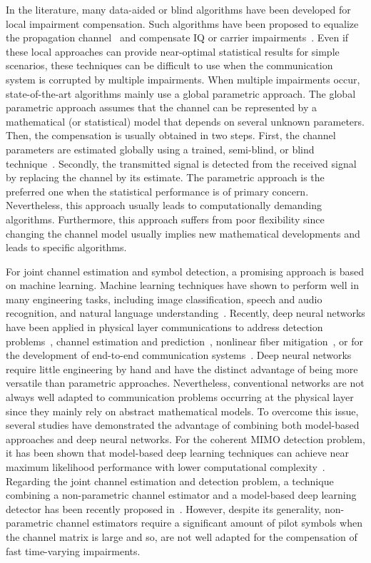 \documentclass{article}
\begin{document}
In the literature, many data-aided or blind algorithms have been developed for local impairment compensation. Such algorithms have been proposed to equalize the propagation channel~\cite{TUG00} and compensate IQ or carrier impairments~\cite{TAR05,TUB05,ANT08,SUN09,NAM12,YAO05,ZOU07}. Even if these local approaches can provide near-optimal statistical results for simple scenarios, these techniques can be difficult to use when  the communication system is corrupted by multiple impairments. When multiple impairments occur, state-of-the-art algorithms mainly use a global parametric approach. The global parametric approach assumes that the channel can be represented by a mathematical (or statistical) model that depends on several unknown parameters. Then, the compensation is usually obtained in two steps. First, the channel parameters are estimated globally using a trained, semi-blind, or blind technique~\cite{VAN97,TUG00,VAL01,GIL05,TAN07,TAR05,TAR07,TUB05,ANT08,HSU08,HOR08,INA09,CAI11,FRU21}. Secondly, the transmitted signal is detected from the received signal by replacing the channel by its estimate. The parametric approach is the preferred one when the statistical performance is of primary concern. Nevertheless, this approach usually leads to computationally demanding algorithms. Furthermore, this approach suffers from poor flexibility since changing the channel model usually implies new mathematical developments and leads to specific algorithms.

For joint channel estimation and symbol detection, a promising approach is based on machine learning. Machine learning techniques have shown to perform well in many engineering tasks, including image classification, speech and audio recognition, and natural language understanding~\cite{LEC15}. Recently, deep neural networks have been applied in physical layer communications to address detection problems~\cite{FAR18,SA19,HE19,KHA20,HE20,SHL20}, channel estimation and prediction~\cite{DEM19}, nonlinear fiber mitigation~\cite{HAG20}, or for the development of end-to-end communication systems~\cite{O2017,DOR17,SIM18}. Deep neural networks require little engineering by hand and have the distinct advantage of being more versatile than parametric approaches. Nevertheless, conventional networks are not always well adapted to communication problems occurring at the physical layer since they mainly rely on abstract mathematical models. To overcome this issue, several studies have demonstrated the advantage of combining both model-based approaches and deep neural networks. For the coherent MIMO detection problem, it has been shown that model-based deep learning techniques can achieve near maximum likelihood performance with lower computational complexity~\cite{SA19,KHA20,SHE20,HE20,SHL20}. Regarding the joint channel estimation and detection problem, a technique combining a non-parametric channel estimator and a model-based deep learning detector has been recently proposed in~\cite{HE20}. However, despite its generality, non-parametric channel estimators require a significant amount of pilot symbols when the channel matrix is large and so, are not well adapted for the compensation of fast time-varying impairments.
\end{document}
